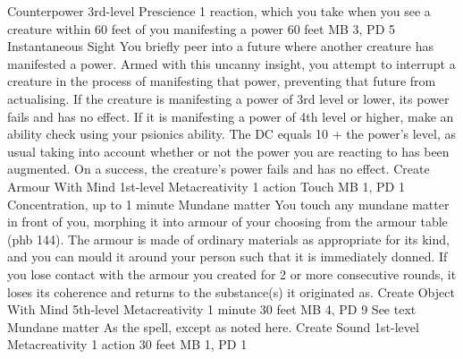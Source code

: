 \DndPowerHeader%
    {Counterpower\label{pwr:counterpower}}
    {3rd-level Prescience}
    {1 reaction, which you take when you see a creature
within 60 feet of you manifesting a power
}
    {60 feet}
    {MB 3, PD 5}
    {Instantaneous}
    {Sight}
You briefly peer into a future where another creature
has manifested a power. Armed with this uncanny insight,
you attempt to interrupt a creature in the process of
manifesting that power, preventing that future from actualising.
If the creature is manifesting a power
of 3rd level or lower, its power fails and has no effect.
If it is manifesting a power of 4th level or higher,
make an ability check using your psionics ability.
The DC equals 10 + the power's level, as usual taking into account
whether or not the power you are reacting to has been augmented.
On a success, the creature's power fails and has no effect.
\DndPowerHeader%
    {Create Armour With Mind\label{pwr:create_armour_with_mind}}
    {1st-level Metacreativity}
    {1 action}
    {Touch}
    {MB 1, PD 1}
    {Concentration, up to 1 minute}
    {Mundane matter}
You touch any mundane matter in front of
you, morphing it into armour of your choosing from the armour
table (phb 144). The armour is made of ordinary materials
as appropriate for its kind, and you can mould it around your person
such that it is immediately donned.
If you lose contact with the armour you created for 2
or more consecutive rounds, it loses its coherence and returns
to the substance(s) it originated as.
\DndPowerHeader%
    {Create Object With Mind\label{pwr:create_object_with_mind}}
    {5th-level Metacreativity}
    {1 minute}
    {30 feet}
    {MB 4, PD 9}
    {See text}
    {Mundane matter}
As the  spell, except as
noted here.
\DndPowerHeader%
    {Create Sound\label{pwr:create_sound}}
    {1st-level Metacreativity}
    {1 action}
    {30 feet}
    {MB 1, PD 1}
